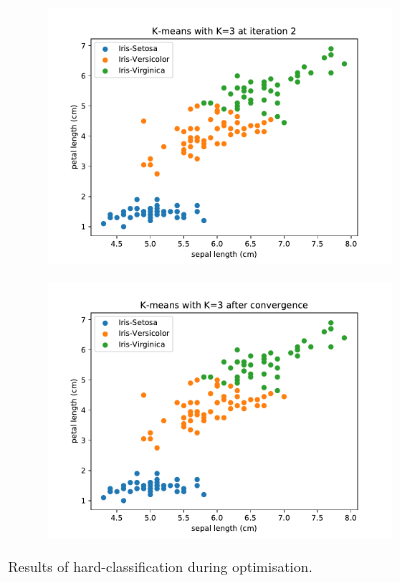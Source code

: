 \documentclass{article}
\begin{document}
\begin{figure}[!ht]
{\begin{subfigure}{0.6\textwidth}
	\includegraphics[width=\textwidth]{./Figures/2_2_Kmeans_iter2}
	\end{subfigure}
	\begin{subfigure}{0.6\textwidth}
	\includegraphics[width=\textwidth]{./Figures/2_2_Kmeans_converged}
	\end{subfigure}
	}	
	\caption{Results of hard-classification during optimisation.}
	\label{2_2_Kmeans_iter}
\end{figure}
\end{document}

